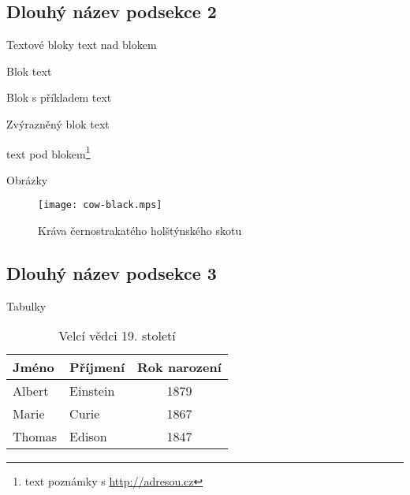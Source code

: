 \documentclass[
]{beamer}
\begin{document}
\subsection[Název podsekce 2]{Dlouhý název podsekce 2}

\begin{frame}{Textové bloky}
text nad blokem
\begin{block}{Blok}
  text
\end{block}
\begin{exampleblock}{Blok s příkladem}
  text
\end{exampleblock}
\begin{alertblock}{Zvýrazněný blok}
  text
\end{alertblock}
text pod blokem\footnote{text poznámky s \url{http://adresou.cz}}
\end{frame}

\begin{frame}{Obrázky}
\begin{figure}
  \texttt{[image: cow-black.mps]}
  \caption{Kráva černostrakatého holštýnského skotu}
\end{figure}
\end{frame}

\subsection[Název podsekce 3]{Dlouhý název podsekce 3}

\begin{frame}{Tabulky}
\begin{table}
  \begin{tabular}{llc}
    Jméno & Příjmení & Rok narození \\ \midrule
    Albert & Einstein & 1879 \\
    Marie & Curie & 1867 \\
    Thomas & Edison & 1847 \\
  \end{tabular}
  \caption{Velcí vědci 19. století}
\end{table}
\end{frame}
\end{document}
